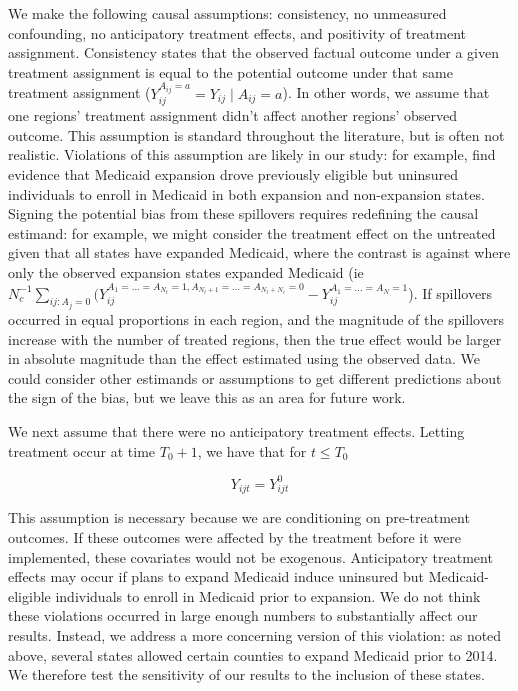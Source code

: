 \documentclass[12pt]{article}
\begin{document}
We make the following causal assumptions: consistency, no unmeasured confounding, no anticipatory treatment effects, and positivity of treatment assignment. Consistency states that the observed factual outcome under a given treatment assignment is equal to the potential outcome under that same treatment assignment ($Y_{ij}^{A_{ij} = a} = Y_{ij} \mid A_{ij} = a$). In other words, we assume that one regions' treatment assignment didn't affect another regions' observed outcome. This assumption is standard throughout the literature, but is often not realistic. Violations of this assumption are likely in our study: for example, \cite{frean2017premium} find evidence that Medicaid expansion drove previously eligible but uninsured individuals to enroll in Medicaid in both expansion and non-expansion states. Signing the potential bias from these spillovers requires redefining the causal estimand: for example, we might consider the treatment effect on the untreated given that all states have expanded Medicaid, where the contrast is against where only the observed expansion states expanded Medicaid (ie $N_c^{-1}\sum_{ij: A_j = 0}(Y_{ij}^{A_1 = ... = A_{N_t} = 1, A_{N_t + 1} = ... = A_{N_t + N_c} = 0} - Y_{ij}^{A_1 = ... = A_N = 1}$). If spillovers occurred in equal proportions in each region, and the magnitude of the spillovers increase with the number of treated regions, then the true effect would be larger in absolute magnitude than the effect estimated using the observed data. We could consider other estimands or assumptions to get different predictions about the sign of the bias, but we leave this as an area for future work.

We next assume that there were no anticipatory treatment effects. Letting treatment occur at time $T_0 + 1$, we have that for $t \le T_0$

$$
Y_{ijt} = Y_{ijt}^0
$$

This assumption is necessary because we are conditioning on pre-treatment outcomes. If these outcomes were affected by the treatment before it were implemented, these covariates would not be exogenous. Anticipatory treatment effects may occur if plans to expand Medicaid induce uninsured but Medicaid-eligible individuals to enroll in Medicaid prior to expansion. We do not think these violations occurred in large enough numbers to substantially affect our results. Instead, we address a more concerning version of this violation: as noted above, several states allowed certain counties to expand Medicaid prior to 2014. We therefore test the sensitivity of our results to the inclusion of these states.
\end{document}
